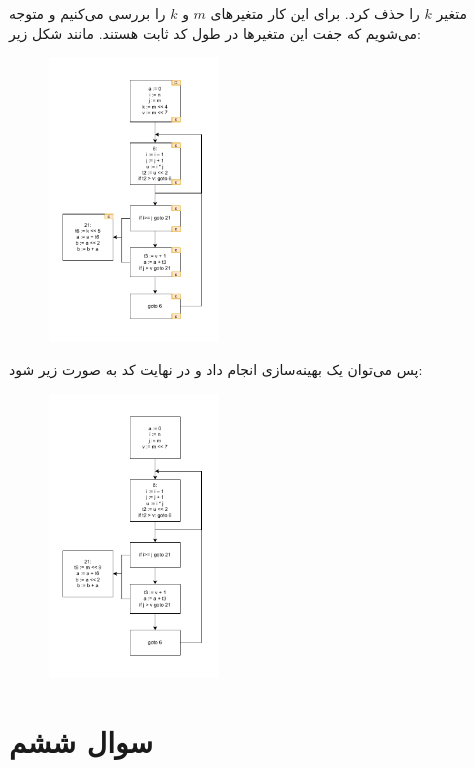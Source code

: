 \documentclass[]{article}
\begin{document}
متغیر
$k$
را حذف کرد. برای این کار
متغیر‌های
$m$ و $k$
را بررسی می‌کنیم و متوجه می‌شویم که جفت این متغیر‌ها در طول کد ثابت هستند. مانند شکل زیر:
\begin{figure}[H]
    \centering
    \includegraphics[width=0.4\textwidth]{figure/Q5-07-k-lifetime.pdf}
\end{figure}
پس می‌توان یک بهینه‌سازی
انجام داد و در نهایت کد به صورت زیر شود:
\begin{figure}[H]
    \centering
    \includegraphics[width=0.4\textwidth]{figure/Q5-Final.pdf}
\end{figure}
\section*{سوال ششم}
\end{document}
